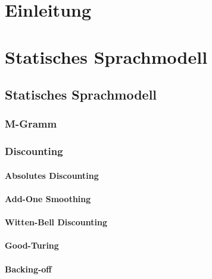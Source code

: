 \chapter{Einleitung}
\label{chapter:Einleitung}
	
	
\chapter{Statisches Sprachmodell}
\label{chapter:Sprach-Modell}

\section{Statisches Sprachmodell}
	

	\subsection{M-Gramm}
  	
  
  \subsection{Discounting}
  	
  
  	\subsubsection{Absolutes Discounting}
  			
  	\subsubsection{Add-One Smoothing}
  			
  	\subsubsection{Witten-Bell Discounting}
  		
		\subsubsection{Good-Turing}
			

		
		\subsubsection{Backing-off}
			
		
